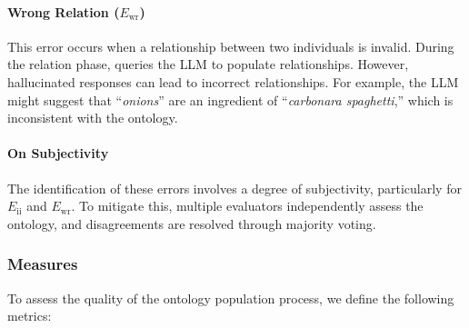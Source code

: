 %
\paragraph{Wrong Relation (\(E_{\text{wr}}\))}

This error occurs when a relationship between two individuals is invalid.
%
During the relation phase, \llmfkg{} queries the \gls{LLM} to populate relationships.
%
However, hallucinated responses can lead to incorrect relationships.
%
For example, the \gls{LLM} might suggest that ``\emph{onions}'' are an ingredient of ``\emph{carbonara spaghetti},'' which is inconsistent with the ontology.

%
\paragraph*{On Subjectivity}

The identification of these errors involves a degree of subjectivity, particularly for \(E_{\text{ii}}\) and \(E_{\text{wr}}\).
%
To mitigate this, multiple evaluators independently assess the ontology, and disagreements are resolved through majority voting.

%
\subsubsection{Measures}
\label{subsubsec:measures}

To assess the quality of the ontology population process, we define the following metrics:


